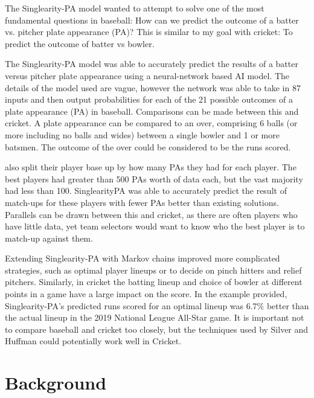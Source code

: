 \documentclass[12pt,a4paper]{report}
\theoremstyle{definition}
\begin{document}
The Singlearity-PA model \citep{silver2021baseball} wanted to attempt to solve one of the most fundamental questions in baseball:	 How can we	predict the outcome of a batter	vs. pitcher plate appearance (PA)? 
This is similar to my goal with cricket: To predict the outcome of batter vs bowler.

The Singlearity-PA model \citep{silver2021baseball} was able to accurately predict the results of a batter versus pitcher plate appearance using a neural-network based AI model. 
The details of the model used are vague, however the network was able to take in 87 inputs and then output probabilities for each of the 21 possible outcomes of a plate appearance (PA) in baseball. 
Comparisons can be made between this and cricket. 
A plate appearance can be compared to an over, comprising 6 balls (or more including no balls and wides) between a single bowler and 1 or more batsmen. 
The outcome of the over could be considered to be the runs scored. 

\citet{silver2021baseball} also split their player base up by how many PAs they had for each player. 
The best players had greater than 500 PAs worth of data each, but the vast majority had less than 100. 
SinglearityPA was able to accurately predict the result of match-ups for these players with fewer PAs better than existing solutions. 
Parallels can be drawn between this and cricket, as there are often players who have little data, yet team selectors would want to know who the best player is to match-up against them.

Extending Singlearity-PA with Markov chains improved more complicated strategies, such as optimal player lineups or to decide on pinch hitters and relief pitchers. 
Similarly, in cricket the batting lineup and choice of bowler at different points in a game have a large impact on the score. 
In the example provided, Singlearity-PA's predicted runs scored for an optimal lineup was 6.7\% better than the actual lineup in the 2019 National League All-Star game. 
It is important not to compare baseball and cricket too closely, but the techniques used by Silver and Huffman could potentially work well in Cricket.

%

\chapter{Background}
\end{document}
